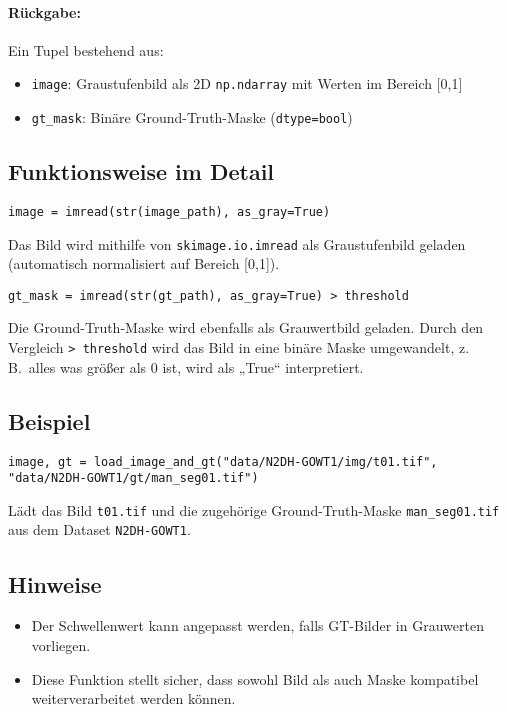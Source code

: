 \documentclass[a4paper,12pt]{article}
\begin{document}
\paragraph{Rückgabe:}
Ein Tupel bestehend aus:
\begin{itemize}
  \item \texttt{image}: Graustufenbild als 2D \texttt{np.ndarray} mit Werten im Bereich [0,1]
  \item \texttt{gt\_mask}: Binäre Ground-Truth-Maske (\texttt{dtype=bool})
\end{itemize}

\subsection*{Funktionsweise im Detail}

\begin{verbatim}
image = imread(str(image_path), as_gray=True)
\end{verbatim}

Das Bild wird mithilfe von \texttt{skimage.io.imread} als Graustufenbild geladen (automatisch normalisiert auf Bereich [0,1]).

\begin{verbatim}
gt_mask = imread(str(gt_path), as_gray=True) > threshold
\end{verbatim}

Die Ground-Truth-Maske wird ebenfalls als Grauwertbild geladen. Durch den Vergleich \texttt{> threshold} wird das Bild in eine binäre Maske umgewandelt, z.\,B.\ alles was größer als 0 ist, wird als „True“ interpretiert.

\subsection*{Beispiel}

\begin{verbatim}
image, gt = load_image_and_gt("data/N2DH-GOWT1/img/t01.tif", 
"data/N2DH-GOWT1/gt/man_seg01.tif")
\end{verbatim}

Lädt das Bild \texttt{t01.tif} und die zugehörige Ground-Truth-Maske \texttt{man\_seg01.tif} aus dem Dataset \texttt{N2DH-GOWT1}.

\subsection*{Hinweise}

\begin{itemize}
  \item Der Schwellenwert kann angepasst werden, falls GT-Bilder in Grauwerten vorliegen.
  \item Diese Funktion stellt sicher, dass sowohl Bild als auch Maske kompatibel weiterverarbeitet werden können.
\end{itemize}
\end{document}

